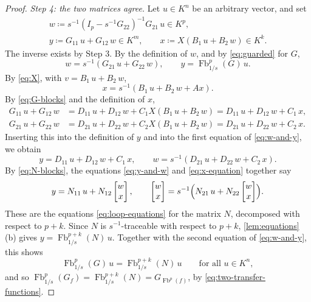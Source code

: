 \documentclass[11pt,a4paper]{article}
\theoremstyle{plain}
\theoremstyle{definition}
\theoremstyle{remark}
\DeclareMathOperator{\Fb}{Fb}
\begin{document}
\begin{proof}
    \emph{Step 4: the two matrices agree.}
    Let $u \in K^n$ be an arbitrary vector, and set
    \begin{gather*}
        w \coloneqq s^{-1} (I_p - s^{-1} G_{22})^{-1} G_{21}\, u \in K^p, \\
        y \coloneqq G_{11}\, u + G_{12}\, w \in K^m,
        \qquad
        x \coloneqq X ( B_1\, u + B_2\, w ) \in K^k .
    \end{gather*}
    The inverse exists by Step 3.
    By the definition of $w$, and by \cref{eq:guarded} for $G$,
    \begin{equation}
        \label{eq:w-and-y}
        w = s^{-1} ( G_{21}\, u + G_{22}\, w ),
        \qquad
        y = \Fb^p_{1/s}(G)\, u .
    \end{equation}
    By \cref{eq:X}, with $v = B_1\, u + B_2\, w$,
    \begin{equation}
        \label{eq:x-equation}
        x = s^{-1} ( B_1\, u + B_2\, w + A x ) .
    \end{equation}
    By \cref{eq:G-blocks} and the definition of $x$,
    \begin{align*}
        G_{11}\, u + G_{12}\, w & = D_{11}\, u + D_{12}\, w + C_1 X ( B_1\, u + B_2\, w ) = D_{11}\, u + D_{12}\, w + C_1\, x, \\
        G_{21}\, u + G_{22}\, w & = D_{21}\, u + D_{22}\, w + C_2 X ( B_1\, u + B_2\, w ) = D_{21}\, u + D_{22}\, w + C_2\, x .
    \end{align*}
    Inserting this into the definition of $y$ and into the first equation of \cref{eq:w-and-y}, we obtain
    \begin{equation}
        \label{eq:y-and-w}
        y = D_{11}\, u + D_{12}\, w + C_1\, x,
        \qquad
        w = s^{-1} ( D_{21}\, u + D_{22}\, w + C_2\, x ) .
    \end{equation}
    By \cref{eq:N-blocks}, the equations \cref{eq:y-and-w} and \cref{eq:x-equation} together say
    \begin{equation*}
        y = N_{11}\, u + N_{12} \begin{bmatrix} w \\ x \end{bmatrix},
        \qquad
        \begin{bmatrix} w \\ x \end{bmatrix} = s^{-1} \Bigl( N_{21}\, u + N_{22} \begin{bmatrix} w \\ x \end{bmatrix} \Bigr) .
    \end{equation*}
    These are the equations \cref{eq:loop-equations} for the matrix $N$, decomposed with respect to $p + k$.
    Since $N$ is $s^{-1}$-traceable with respect to $p + k$, \cref{lem:equations}\,(b) gives $y = \Fb^{p+k}_{1/s}(N)\, u$.
    Together with the second equation of \cref{eq:w-and-y}, this shows
    \begin{equation*}
        \Fb^p_{1/s}(G)\, u = \Fb^{p+k}_{1/s}(N)\, u \qquad \text{for all } u \in K^n,
    \end{equation*}
    and so $\Fb^p_{1/s}(G_f) = \Fb^{p+k}_{1/s}(N) = G_{\Fb^p(f)}$, by \cref{eq:two-transfer-functions}.
\end{proof}
\end{document}
